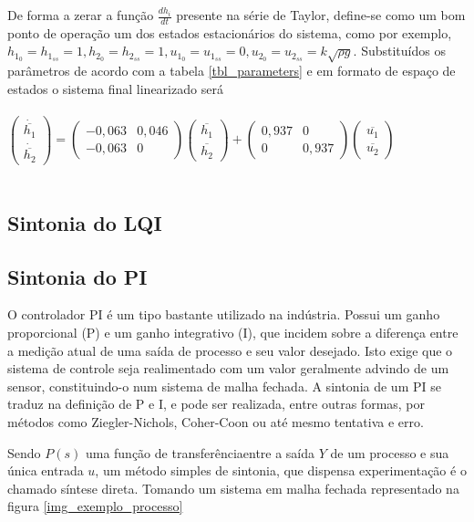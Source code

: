 De forma a zerar a função $\frac{dh_i}{dt}$ presente na série de Taylor, define-se como um bom ponto de operação um dos estados estacionários do sistema, como por exemplo,  $h_{1_0}=h_{1_{ss}}=1, h_{2_0}=h_{2_{ss}}=1, u_{1_0}=u_{1_{ss}}=0, u_{2_0}=u_{2_{ss}}=k\sqrt{\rho g}$. Substituídos os parâmetros de acordo com a tabela \ref{tbl_parameters} e em formato de espaço de estados o sistema final linearizado será
\\\\
$
\begin{pmatrix} \dot{\overline{h_1}} \\ \dot{\overline{h_2}} \end{pmatrix} = \begin{pmatrix} -0,063 & 0,046 \\ -0,063 & 0 \end{pmatrix} \begin{pmatrix} \overline{h_1} \\ \overline{h_2} \end{pmatrix} + \begin{pmatrix} 0,937 & 0 \\ 0 & 0,937 \end{pmatrix} \begin{pmatrix} \overline{u_1} \\ \overline{u_2} \end{pmatrix}
$
\\\\
\subsection{Sintonia do LQI}

\subsection{Sintonia do PI}

O controlador PI é um tipo bastante utilizado na indústria. Possui um ganho proporcional (P) e um ganho integrativo (I), que incidem sobre a diferença entre a medição atual de uma saída de processo e seu valor desejado. Isto exige que o sistema de controle seja realimentado com um valor geralmente advindo de um sensor, constituindo-o num sistema de malha fechada. A sintonia de um PI se traduz na definição de P e I, e pode ser realizada, entre outras formas, por métodos como Ziegler-Nichols, Coher-Coon ou até mesmo tentativa e erro.

Sendo $P(s)$ uma função de transferênciaentre a saída $Y$ de um processo e sua única entrada $u$, um método simples de sintonia, que dispensa experimentação é o chamado síntese direta.
Tomando um sistema em malha fechada representado na figura \ref{img_exemplo_processo}

